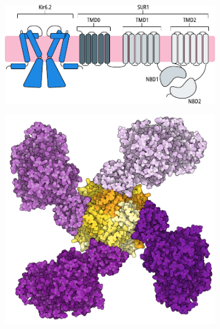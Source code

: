 \begin{figure}[h]
	\centering
	\begin{subfigure}[t]{0.9\textwidth}
		\caption{}\label{ch1fig:katp_cartoon}
		\centering
		\includegraphics[width=\textwidth]{katp_cartoon.pdf}
	\end{subfigure}
	\vfill
	\begin{subfigure}[t]{0.45\textwidth}
		\caption{}\label{ch1fig:sur_topdown}
		\centering
		\includegraphics[width=\textwidth]{sur_topdown_propellor.pdf}
	\end{subfigure}
	\hfill
	\begin{subfigure}[t]{0.45\textwidth}
		\caption{}\label{ch1fig:sur_ctd}
		\centering

\end{subfigure}
\end{figure}

